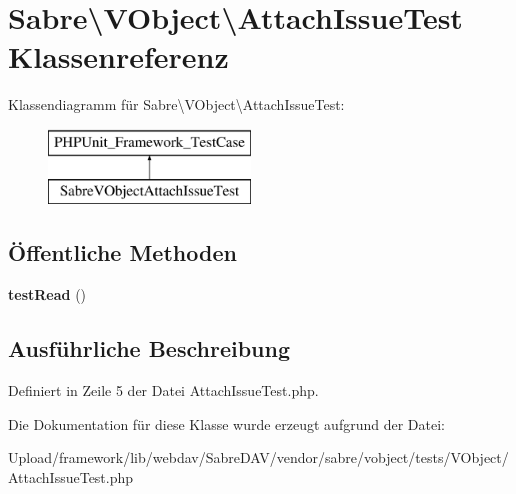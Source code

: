 \hypertarget{class_sabre_1_1_v_object_1_1_attach_issue_test}{}\section{Sabre\textbackslash{}V\+Object\textbackslash{}Attach\+Issue\+Test Klassenreferenz}
\label{class_sabre_1_1_v_object_1_1_attach_issue_test}
Klassendiagramm für Sabre\textbackslash{}V\+Object\textbackslash{}Attach\+Issue\+Test\+:\begin{figure}[H]
\begin{center}
\leavevmode
\includegraphics[height=2.000000cm]{class_sabre_1_1_v_object_1_1_attach_issue_test}
\end{center}
\end{figure}
\subsection*{Öffentliche Methoden}
\begin{DoxyCompactItemize}
\item 
\mbox{\label{class_sabre_1_1_v_object_1_1_attach_issue_test_ae81f8c16bce6e6edd9da3b2c52a7887b}} 
{\bfseries test\+Read} ()
\end{DoxyCompactItemize}


\subsection{Ausführliche Beschreibung}


Definiert in Zeile 5 der Datei Attach\+Issue\+Test.\+php.



Die Dokumentation für diese Klasse wurde erzeugt aufgrund der Datei\+:\begin{DoxyCompactItemize}
\item 
Upload/framework/lib/webdav/\+Sabre\+D\+A\+V/vendor/sabre/vobject/tests/\+V\+Object/Attach\+Issue\+Test.\+php\end{DoxyCompactItemize}
